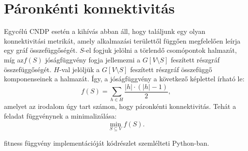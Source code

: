 \section{Páronkénti konnektivitás}\label{sec:PAIRWISE_CONNECTIVITY}

Egycélú CNDP esetén a kihívás abban áll, hogy találjunk egy olyan konnektivitási metrikát,
amely alkalmazási területtől függően megfelelően leírja egy gráf összefüggőségét.
$S$-el fogjuk jelölni a törlendő csomópontok halmazát,
míg az$f(S)$ jóságfüggvény fogja jellemezni a $G[V \setminus S]$ feszített részgráf összefüggőségét.
$H$-val jelöljük a $G[V \setminus S]$ feszített részgráf összefüggő komponenseinek a halmazát.
Így, a jóságfüggvény a következő képlettel írható le:
\begin{equation}\label{eqn:PAIRWISE_CONNECTIVITY}
  f(S) = \sum_{h \in H} \frac{|h| \cdot (|h| - 1)}{2},
\end{equation}
amelyet az irodalom \cite{ventresca2012global, aringhieri2016general} úgy tart számon,
hogy páronkénti konnektivitás.
Tehát a feladat  függvénynek a minimalizálása:
\begin{equation}\label{eqn:MIN_PAIRWISE_CONNECTIVITY}
  \min_{S \subseteq V} f(S).
\end{equation}

 fitness függvény implementációját
 kódrészlet szemlélteti Python-ban.

